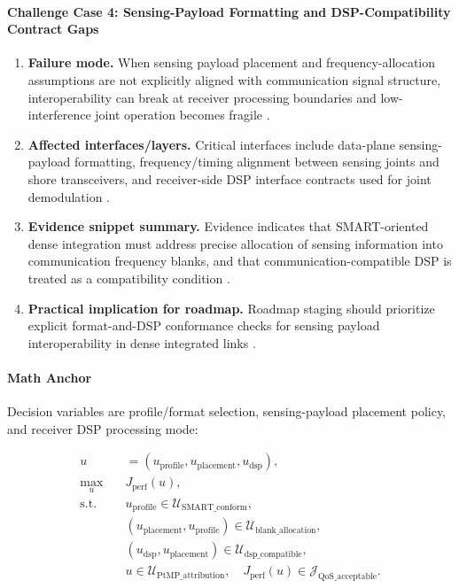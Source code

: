\paragraph{Challenge Case 4: Sensing-Payload Formatting and DSP-Compatibility Contract Gaps}
\begin{enumerate}
    \item \textbf{Failure mode.} When sensing payload placement and frequency-allocation assumptions are not explicitly aligned with communication signal structure, interoperability can break at receiver processing boundaries and low-interference joint operation becomes fragile \cite{O_ISAC_220}.
    \item \textbf{Affected interfaces/layers.} Critical interfaces include data-plane sensing-payload formatting, frequency/timing alignment between sensing joints and shore transceivers, and receiver-side DSP interface contracts used for joint demodulation \cite{O_ISAC_220}.
    \item \textbf{Evidence snippet summary.} Evidence indicates that SMART-oriented dense integration must address precise allocation of sensing information into communication frequency blanks, and that communication-compatible DSP is treated as a compatibility condition \cite{O_ISAC_220}.
    \item \textbf{Practical implication for roadmap.} Roadmap staging should prioritize explicit format-and-DSP conformance checks for sensing payload interoperability in dense integrated links \cite{O_ISAC_220}.
\end{enumerate}

\paragraph{Math Anchor}
Decision variables are profile/format selection, sensing-payload placement policy, and receiver DSP processing mode:

\[
\begin{aligned}
u &= (u_{\mathrm{profile}},u_{\mathrm{placement}},u_{\mathrm{dsp}}),\\
\max_{u}\quad & J_{\mathrm{perf}}(u),\\
\text{s.t.}\quad
& u_{\mathrm{profile}} \in \mathcal{U}_{\mathrm{SMART\_conform}},\\
& (u_{\mathrm{placement}},u_{\mathrm{profile}}) \in \mathcal{U}_{\mathrm{blank\_allocation}},\\
& (u_{\mathrm{dsp}},u_{\mathrm{placement}}) \in \mathcal{U}_{\mathrm{dsp\_compatible}},\\
& u \in \mathcal{U}_{\mathrm{PtMP\_attribution}},\quad J_{\mathrm{perf}}(u) \in \mathcal{J}_{\mathrm{QoS\_acceptable}}.
\end{aligned}
\]

